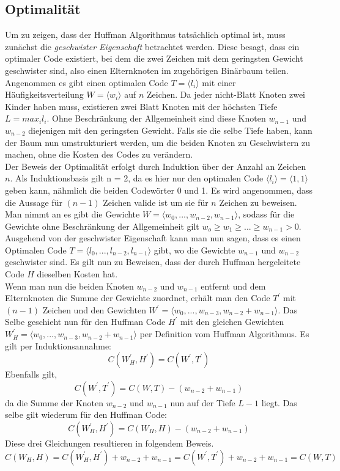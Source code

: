 \documentclass[course=erap]{aspdoc}
\begin{document}
\subsection{Optimalität}

Um zu zeigen, dass der Huffman Algorithmus tatsächlich optimal ist, muss zunächst die \textit{geschwister Eigenschaft} betrachtet werden.
Diese besagt, dass ein optimaler Code existiert, bei dem die zwei Zeichen mit dem geringsten Gewicht geschwister sind, also einen Elternknoten im zugehörigen Binärbaum teilen.\\
Angenommen es gibt einen optimalen Code $T = \langle l_i \rangle $ mit einer Häufigkeitsverteilung $W = \langle w_i \rangle $ auf $n$ Zeichen.
Da jeder nicht-Blatt Knoten zwei Kinder haben muss, existieren zwei Blatt Knoten mit der höchsten Tiefe $ L = max_i l_i$. Ohne Beschränkung der Allgemeinheit sind diese Knoten $w_{n-1}$ und $w_{n-2}$ diejenigen mit den geringsten Gewicht. Falls sie die selbe Tiefe haben, kann der Baum nun umstrukturiert werden, um die beiden Knoten zu Geschwistern zu machen, ohne die Kosten des Codes zu verändern.\\
Der Beweis der Optimalität erfolgt durch Induktion über der Anzahl an Zeichen $n$. \cite{HufProof}
Als Induktionsbasis gilt n = 2, da es hier nur den optimalen Code $ \langle l_i \rangle = \langle 1, 1 \rangle $ geben kann, nähmlich die beiden Codewörter 0 und 1.
Es wird angenommen, dass die Aussage für $(n-1)$ Zeichen valide ist um sie für $n$ Zeichen zu beweisen.
Man nimmt an es gibt die Gewichte $W = \langle w_0,..., w_{n-2}, w_{n-1} \rangle $, sodass für die Gewichte ohne Beschränkung der Allgemeinheit gilt $w_o \ge w_1 \ge ... \ge w_{n-1} > 0$.\\
Ausgehend von der geschwister Eigenschaft kann man nun sagen, dass es einen Optimalen Code $T = \langle l_0,..., l_{n-2}, l_{n-1} \rangle$ gibt, wo die Gewichte $w_{n-1}$ und $w_{n-2}$ geschwister sind. Es gilt nun zu Beweisen, dass der durch Huffman hergeleitete Code $H$ dieselben Kosten hat.\\
Wenn man nun die beiden Knoten $w_{n-2}$ und $w_{n-1}$ entfernt und dem Elternknoten die Summe der Gewichte zuordnet, erhält man den Code $T^{\prime}$ mit $(n-1)$ Zeichen und den Gewichten $W^{\prime} = \langle w_0,..., w_{n-3}, w_{n-2} + w_{n-1} \rangle$.
Das Selbe geschieht nun für den Huffman Code $H^{\prime}$ mit den gleichen Gewichten $W_H^{\prime} = \langle w_0,..., w_{n-3}, w_{n-2} + w_{n-1} \rangle $ per Definition vom Huffman Algorithmus.
Es gilt per Induktionsannahme: 
$$C(W_H^{\prime}, H^{\prime}) = C(W^\prime, T^{\prime})$$
Ebenfalls gilt,
$$ C(W^\prime, T^{\prime}) = C(W, T) - (w_{n-2} + w_{n-1})$$
da die Summe der Knoten $w_{n-2}$ und $w_{n-1}$ nun auf der Tiefe $L-1$ liegt.
Das selbe gilt wiederum für den Huffman Code:
$$ C(W_H^\prime, H^{\prime}) = C(W_H, H) - (w_{n-2} + w_{n-1})$$
Diese drei Gleichungen resultieren in folgendem Beweis.
$$ C(W_H, H) = C(W_H^\prime, H^{\prime}) + w_{n-2} + w_{n-1} = C(W^\prime, T^{\prime}) + w_{n-2} + w_{n-1} = C(W, T) $$
\end{document}
